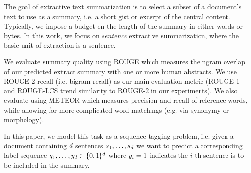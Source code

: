%

The goal of extractive text summarization is to select a subset of a document's
text to use as a summary, i.e. a short gist or excerpt of the central content.
Typically, we impose a budget on the length of the summary in either 
words or bytes. In this work, we focus on \textit{sentence} extractive 
summarization, 
where the basic unit of extraction is a sentence.

We evaluate summary quality using ROUGE \cite{lin2004rouge} 
which measures the ngram
overlap of our predicted extract summary with one or more human abstracts.
We use ROUGE-2 recall (i.e. bigram recall) as our main evaluation metric 
(ROUGE-1 and ROUGE-LCS trend similarity to ROUGE-2 in our experiments).
We also evaluate using METEOR \cite{denkowski:lavie:meteor-wmt:2014}
which measures precision and recall of reference words, while allowing for
more complicated word matchings (e.g. via synonymy or morphology).

In this paper, we model this task as a sequence tagging problem, 
i.e. given a document containing $d$ sentences $\sent_1, \ldots, 
\sent_{\docsize}$ we want to predict a corresponding label sequence $\slabel_1,
\ldots, \slabel_{\docsize} \in \{0, 1\}^{\docsize}$ where $\slabel_i = 1$ 
indicates the $i$-th sentence is to be included in the summary.


